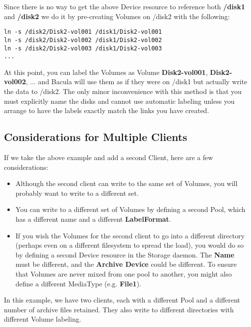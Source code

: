 Since there is no way to get the above Device resource to reference both {\bf
/disk1} and {\bf /disk2} we do it by pre-creating Volumes on /disk2 with the
following: 

\footnotesize
\begin{verbatim}
ln -s /disk2/Disk2-vol001 /disk1/Disk2-vol001
ln -s /disk2/Disk2-vol002 /disk1/Disk2-vol002
ln -s /disk2/Disk2-vol003 /disk1/Disk2-vol003
...
\end{verbatim}
\normalsize

At this point, you can label the Volumes as Volume {\bf Disk2-vol001}, {\bf
Disk2-vol002}, ... and Bacula will use them as if they were on /disk1 but
actually write the data to /disk2. The only minor inconvenience with this
method is that you must explicitly name the disks and cannot use automatic
labeling unless you arrange to have the labels exactly match the links you
have created. 
\label{MultipleClients}

\subsection*{Considerations for Multiple Clients}

If we take the above example and add a second Client, here are a few
considerations: 

\begin{itemize}
\item Although the second client can write to the same set of  Volumes, you
   will probably want to write to a different  set. 
\item You can write to a different set of Volumes by defining  a second Pool,
   which has a different name and a different  {\bf LabelFormat}.  
\item If you wish the Volumes for the second client to go into  a different
   directory (perhaps even on a different filesystem  to spread the load), you
   would do so by defining a second  Device resource in the Storage daemon. The
{\bf Name}  must be different, and the {\bf Archive Device} could  be
different. To ensure that Volumes are never mixed from  one pool to another,
you might also define a different  MediaType (e.g. {\bf File1}). 
\end{itemize}

In this example, we have two clients, each with a different Pool and a
different number of archive files retained. They also write to different
directories with different Volume labeling. 

